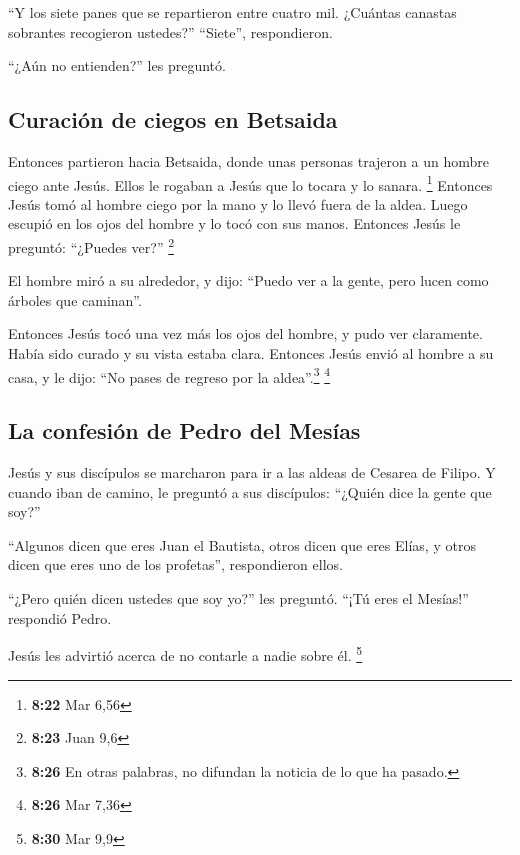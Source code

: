  ``Y los siete panes que se repartieron entre cuatro mil.
¿Cuántas canastas sobrantes recogieron ustedes?'' ``Siete'',
respondieron.

 ``¿Aún no entienden?'' les preguntó.

\hypertarget{curaciuxf3n-de-ciegos-en-betsaida}{%
\subsection{Curación de ciegos en
Betsaida}\label{curaciuxf3n-de-ciegos-en-betsaida}}

 Entonces partieron hacia Betsaida, donde unas personas
trajeron a un hombre ciego ante Jesús. Ellos le rogaban a Jesús que lo
tocara y lo sanara. \footnote{\textbf{8:22} Mar 6,56} 
Entonces Jesús tomó al hombre ciego por la mano y lo llevó fuera de la
aldea. Luego escupió en los ojos del hombre y lo tocó con sus manos.
Entonces Jesús le preguntó: ``¿Puedes ver?'' \footnote{\textbf{8:23}
  Juan 9,6}

 El hombre miró a su alrededor, y dijo: ``Puedo ver a la
gente, pero lucen como árboles que caminan''.

 Entonces Jesús tocó una vez más los ojos del hombre, y
pudo ver claramente. Había sido curado y su vista estaba clara.
 Entonces Jesús envió al hombre a su casa, y le dijo:
``No pases de regreso por la aldea''.\footnote{\textbf{8:26} En otras
  palabras, no difundan la noticia de lo que ha pasado.} \footnote{\textbf{8:26}
  Mar 7,36}

\hypertarget{la-confesiuxf3n-de-pedro-del-mesuxedas}{%
\subsection{La confesión de Pedro del
Mesías}\label{la-confesiuxf3n-de-pedro-del-mesuxedas}}

 Jesús y sus discípulos se marcharon para ir a las aldeas
de Cesarea de Filipo. Y cuando iban de camino, le preguntó a sus
discípulos: ``¿Quién dice la gente que soy?''

 ``Algunos dicen que eres Juan el Bautista, otros dicen
que eres Elías, y otros dicen que eres uno de los profetas'',
respondieron ellos.

 ``¿Pero quién dicen ustedes que soy yo?'' les preguntó.
``¡Tú eres el Mesías!'' respondió Pedro.

 Jesús les advirtió acerca de no contarle a nadie sobre
él. \footnote{\textbf{8:30} Mar 9,9}

